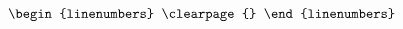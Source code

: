 \documentclass[10pt]{article}
\begin{document}
\[\begin{linenumbers}
%

\clearpage{}

\end{linenumbers}\]
\end{document}
